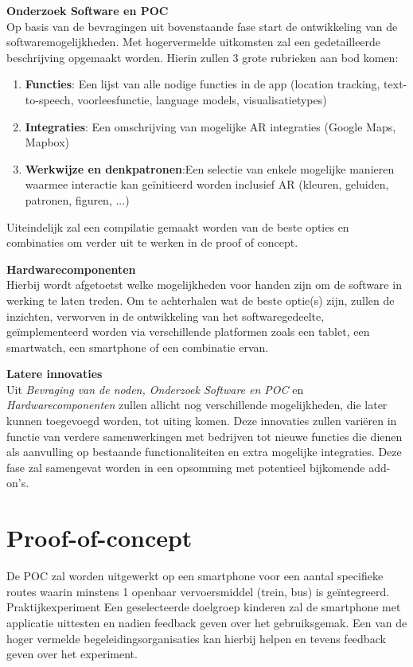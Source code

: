 \documentclass{hogent-article}
\begin{document}
    \textbf{Onderzoek Software en POC} \\
    Op basis van de bevragingen uit bovenstaande fase start de ontwikkeling van de softwaremogelijkheden. Met hogervermelde uitkomsten zal een gedetailleerde beschrijving opgemaakt worden. Hierin zullen 3 grote rubrieken aan bod komen:
    \begin{enumerate}
        \item \textbf{Functies}: Een lijst van alle nodige functies in de app (location tracking, text-to-speech, voorleesfunctie, language models, visualisatietypes)
        \item \textbf{Integraties}: Een omschrijving van mogelijke AR integraties (Google Maps, Mapbox)
        \item \textbf{Werkwijze en denkpatronen}:Een selectie van enkele mogelijke manieren waarmee interactie kan geïnitieerd worden inclusief AR (kleuren, geluiden, patronen, figuren, ...)
    \end{enumerate}
    Uiteindelijk zal een compilatie gemaakt worden van de beste opties en combinaties om verder uit te werken in de proof of concept.
    
    \textbf{Hardwarecomponenten} \\
    Hierbij wordt afgetoetst welke mogelijkheden voor handen zijn om de software in werking te laten treden. Om te achterhalen wat de beste optie(s) zijn, zullen de inzichten, verworven in de ontwikkeling van het softwaregedeelte, geïmplementeerd worden via verschillende platformen zoals een tablet, een smartwatch, een smartphone of een combinatie ervan.
    
    \textbf{Latere innovaties} \\
    Uit \emph{Bevraging van de noden, Onderzoek Software en POC} en \emph{Hardwarecomponenten} zullen allicht nog verschillende mogelijkheden, die later kunnen toegevoegd worden, tot uiting komen. Deze innovaties zullen variëren in functie van verdere samenwerkingen met bedrijven tot nieuwe functies die dienen als aanvulling op bestaande functionaliteiten en extra mogelijke integraties. Deze fase zal samengevat worden in een opsomming met potentieel bijkomende add-on's.
    
    \section{Proof-of-concept}%
    \label{sec:proof-of-concept}
    De POC zal worden uitgewerkt op een smartphone voor een aantal specifieke routes waarin minstens 1 openbaar vervoersmiddel (trein, bus) is geïntegreerd.
    Praktijkexperiment
    Een geselecteerde doelgroep kinderen zal de smartphone met applicatie uittesten en nadien feedback geven over het gebruiksgemak. Een van de hoger vermelde begeleidingsorganisaties kan hierbij helpen en tevens feedback geven over het experiment.
\end{document}
